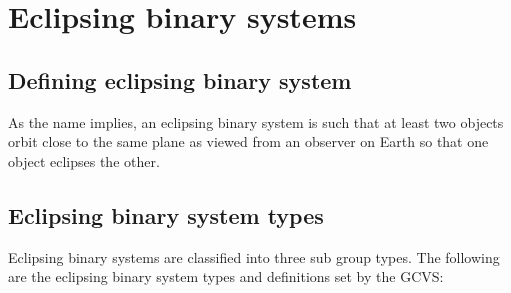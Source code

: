 \chapter{Eclipsing binary systems}
\label{chp:ebsystems}

\section{Defining eclipsing binary system}
As the name implies, an eclipsing binary system is such that at least two objects orbit close to the
same plane as viewed from an observer on Earth so that one object eclipses the other.

\section{Eclipsing binary system types}
Eclipsing binary systems are classified into three sub group types.
The following are the eclipsing binary system types and definitions set by the GCVS$\colon$
